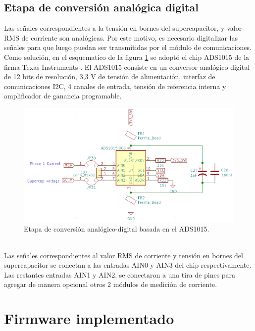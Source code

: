 \subsection{Etapa de conversión analógica digital}
Las señales correspondientes a la tensión en bornes del supercapacitor, y valor RMS de corriente son analógicas. Por este motivo, es necesario digitalizar las señales para que luego puedan ser transmitidas por el módulo de comunicaciones.\\
Como solución, en el esquematico de la figura \ref{fig:ctoadc} se adoptó el chip ADS1015 de la firma Texas Instruments \citep{ads1015}. 
El ADS1015 consiste en un conversor analógico digital de 12 bits de resolución, 3,3 V de tensión de alimentación, interfaz de comunicaciones I2C, 4 canales de entrada, tensión de referencia interna y amplificador de ganancia programable.\\
\begin{figure}[h!]
	\centering
	\includegraphics[width=1.0\linewidth]{Figures/cto_adc}
	\caption{Etapa de conversión analógico-digital basada en el ADS1015.}
	\label{fig:ctoadc}
\end{figure}\\
Las señales correspondientes al valor RMS de corriente y tensión en bornes del supercapacitor se conectan a las entradas AIN0 y AIN3 del chip respectivamente. Las restantes entradas AIN1 y AIN2, se conectaron a una tira de pines para agregar de manera opcional otros 2 módulos de medición de corriente.\\


\section{Firmware implementado}
\label{seccion_firmware}
